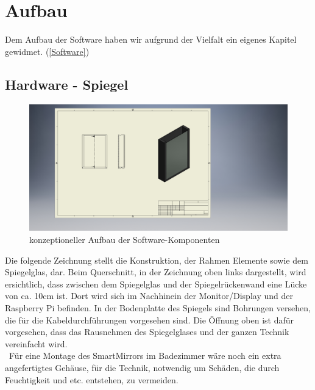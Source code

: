 \section{Aufbau}
Dem Aufbau der Software haben wir aufgrund der Vielfalt ein eigenes Kapitel gewidmet. (\ref{Software})
\subsection{Hardware - Spiegel}
\begin{figure}[h]
\centering
\includegraphics[width=150mm]{pictures/SmartMirror-Konstruktion.jpg}
\caption{konzeptioneller Aufbau der Software-Komponenten}
\end{figure}
Die folgende Zeichnung stellt die Konstruktion, der Rahmen Elemente sowie dem Spiegelglas, dar. Beim Querschnitt, in der Zeichnung oben links dargestellt, wird ersichtlich, dass zwischen dem Spiegelglas und der Spiegelrückenwand eine Lücke von ca. 10cm ist. Dort wird sich im Nachhinein der Monitor/Display und der Raspberry Pi befinden. In der Bodenplatte des Spiegels sind Bohrungen versehen, die für die Kabeldurchführungen vorgesehen sind. Die Öffnung oben ist dafür vorgesehen, dass das Rausnehmen des Spiegelglases und der ganzen Technik vereinfacht wird.\\\
Für eine Montage des SmartMirrors im Badezimmer wäre noch ein extra angefertigtes Gehäuse, für die Technik, notwendig um Schäden, die durch Feuchtigkeit und etc. entstehen, zu vermeiden.
